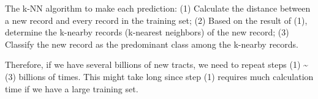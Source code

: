 \documentclass[]{article}
\begin{document}
The k-NN algorithm to make each prediction: (1) Calculate the distance
between a new record and every record in the training set; (2) Based on
the result of (1), determine the k-nearby records (k-nearest neighbors)
of the new record; (3) Classify the new record as the predominant class
among the k-nearby records.

Therefore, if we have several billions of new tracts, we need to repeat
steps (1) \textasciitilde{} (3) billions of times. This might take long
since step (1) requires much calculation time if we have a large
training set.
\end{document}
